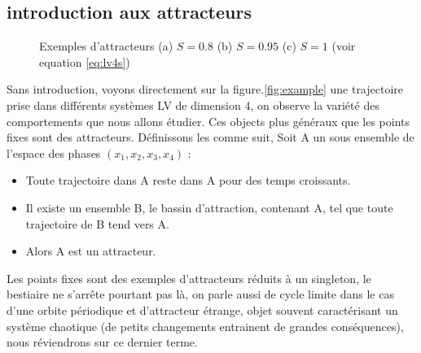 \documentclass{wsdcr}
\begin{document}
\subsection{introduction aux attracteurs}
\begin{figure}
    \centering
    \caption{Exemples d'attracteurs (a) $S=0.8$ (b) $S=0.95$ (c) $S=1$ (voir equation \ref{eq:lv4s})}
    \label{fig:exemple}
\end{figure}
Sans introduction, voyons directement sur la figure.\ref{fig:example} une trajectoire prise dans différents systèmes LV de dimension 4, on observe la variété des comportements que nous allons étudier. Ces objects plus généraux que les points fixes sont des attracteurs. Définissons les comme suit, Soit A un sous ensemble de l'espace des phases $(x_1,x_2,x_3,x_4)$ :
\begin{itemize}
	\item Toute trajectoire dans A reste dans A pour des temps croissants.
	\item Il existe un ensemble B, le bassin d'attraction, contenant A, tel que toute trajectoire de B tend vers A.
	\item Alors A est un attracteur.
\end{itemize}
Les points fixes sont des exemples d'attracteurs réduits à un singleton, le bestiaire ne s'arrête pourtant pas là, on parle aussi de cycle limite dans le cas d'une orbite périodique et d'attracteur étrange, objet souvent caractérisant un système chaotique (de petits changements entrainent de grandes conséquences), nous réviendrons sur ce dernier terme. \\
\end{document}
